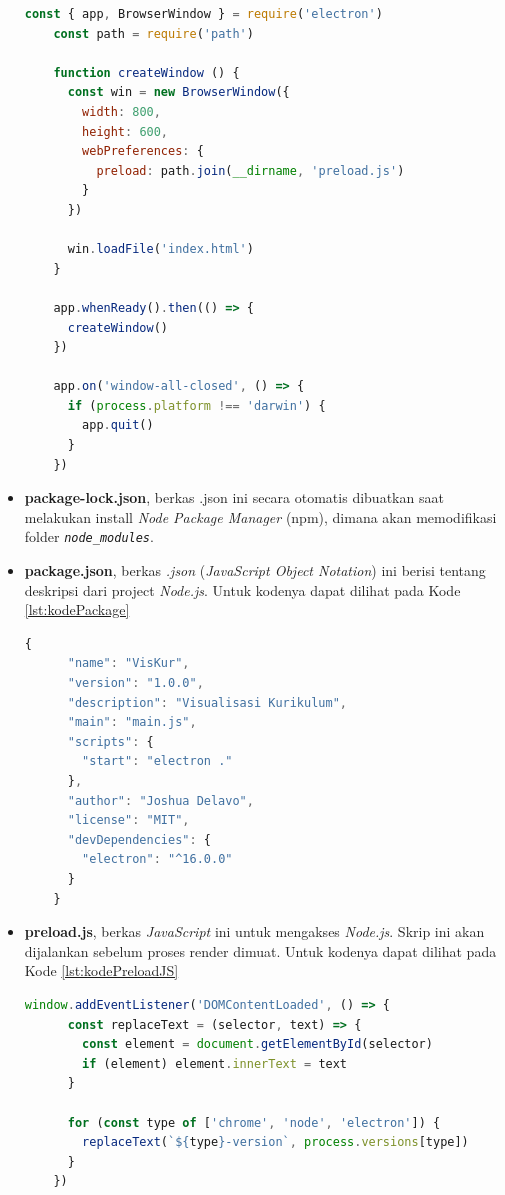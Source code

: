 \begin{itemize}
    \begin{lstlisting}[language=JavaScript, caption=Kode \textit{main.js}\label{lst:kodeMainJS}]
    const { app, BrowserWindow } = require('electron')
    const path = require('path')
    
    function createWindow () {
      const win = new BrowserWindow({
        width: 800,
        height: 600,
        webPreferences: {
          preload: path.join(__dirname, 'preload.js')
        }
      })
    
      win.loadFile('index.html')
    }
    
    app.whenReady().then(() => {
      createWindow()
    })
    
    app.on('window-all-closed', () => {
      if (process.platform !== 'darwin') {
        app.quit()
      }
    })
    \end{lstlisting}
    
    \item \textbf{package-lock.json}, berkas .json ini secara otomatis dibuatkan saat melakukan install \textit{Node Package Manager} (npm), dimana akan memodifikasi folder \textit{\texttt{node\_modules}}.
    
    \item \textbf{package.json}, berkas \textit{.json} (\textit{JavaScript Object Notation}) ini berisi tentang deskripsi dari project \textit{Node.js}. Untuk kodenya dapat dilihat pada Kode \ref{lst:kodePackage}
    
    \begin{lstlisting}[language=JavaScript, caption=Kode \textit{package.json}\label{lst:kodePackage}]
    {
      "name": "VisKur",
      "version": "1.0.0",
      "description": "Visualisasi Kurikulum",
      "main": "main.js",
      "scripts": {
        "start": "electron ."
      },
      "author": "Joshua Delavo",
      "license": "MIT",
      "devDependencies": {
        "electron": "^16.0.0"
      }
    }
    \end{lstlisting}
    
    \item \textbf{preload.js}, berkas \textit{JavaScript} ini untuk mengakses \textit{Node.js}. Skrip ini akan dijalankan sebelum proses render dimuat. Untuk kodenya dapat dilihat pada Kode \ref{lst:kodePreloadJS}
    
    \begin{lstlisting}[language=JavaScript, caption=Kode \textit{preload.js}\label{lst:kodePreloadJS}]
    window.addEventListener('DOMContentLoaded', () => {
      const replaceText = (selector, text) => {
        const element = document.getElementById(selector)
        if (element) element.innerText = text
      }
    
      for (const type of ['chrome', 'node', 'electron']) {
        replaceText(`${type}-version`, process.versions[type])
      }
    })
    \end{lstlisting}
    
\end{itemize}


